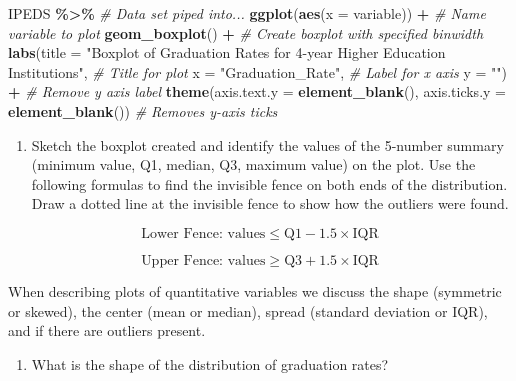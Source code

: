 \documentclass[
]{report}
\newenvironment{Shaded}{\begin{snugshade}}{\end{snugshade}}
\newcommand{\AttributeTok}[1]{\textcolor[rgb]{0.13,0.29,0.53}{#1}}
\newcommand{\CommentTok}[1]{\textcolor[rgb]{0.56,0.35,0.01}{\textit{#1}}}
\newcommand{\FunctionTok}[1]{\textcolor[rgb]{0.13,0.29,0.53}{\textbf{#1}}}
\newcommand{\NormalTok}[1]{#1}
\newcommand{\SpecialCharTok}[1]{\textcolor[rgb]{0.81,0.36,0.00}{\textbf{#1}}}
\newcommand{\StringTok}[1]{\textcolor[rgb]{0.31,0.60,0.02}{#1}}
\providecommand{\tightlist}{%
  \setlength{\itemsep}{0pt}\setlength{\parskip}{0pt}}
\begin{document}
\begin{Shaded}
\begin{Highlighting}[]
\NormalTok{IPEDS }\SpecialCharTok{\%\textgreater{}\%} \CommentTok{\# Data set piped into...}
\FunctionTok{ggplot}\NormalTok{(}\FunctionTok{aes}\NormalTok{(}\AttributeTok{x =}\NormalTok{ variable)) }\SpecialCharTok{+}   \CommentTok{\# Name variable to plot}
  \FunctionTok{geom\_boxplot}\NormalTok{() }\SpecialCharTok{+}  \CommentTok{\# Create boxplot with specified binwidth}
  \FunctionTok{labs}\NormalTok{(}\AttributeTok{title =} \StringTok{"Boxplot of Graduation Rates for 4{-}year Higher Education Institutions"}\NormalTok{, }\CommentTok{\# Title for plot}
       \AttributeTok{x =} \StringTok{"Graduation\_Rate"}\NormalTok{, }\CommentTok{\# Label for x axis}
       \AttributeTok{y =} \StringTok{""}\NormalTok{) }\SpecialCharTok{+} \CommentTok{\# Remove y axis label}
    \FunctionTok{theme}\NormalTok{(}\AttributeTok{axis.text.y =} \FunctionTok{element\_blank}\NormalTok{(), }
          \AttributeTok{axis.ticks.y =} \FunctionTok{element\_blank}\NormalTok{()) }\CommentTok{\# Removes y{-}axis ticks}
\end{Highlighting}
\end{Shaded}

\begin{enumerate}
\def\labelenumi{\arabic{enumi}.}
\setcounter{enumi}{6}
\tightlist
\item
  Sketch the boxplot created and identify the values of the 5-number summary (minimum value, Q1, median, Q3, maximum value) on the plot. Use the following formulas to find the invisible fence on both ends of the distribution. Draw a dotted line at the invisible fence to show how the outliers were found.
\end{enumerate}

\[\text{Lower Fence: values} \le \text{Q}1 - 1.5\times\text{IQR}\]

\[\text{Upper Fence: values} \ge \text{Q}3 + 1.5\times\text{IQR}\]
\vspace{1.8in}

When describing plots of quantitative variables we discuss the shape (symmetric or skewed), the center (mean or median), spread (standard deviation or IQR), and if there are outliers present.

\begin{enumerate}
\def\labelenumi{\arabic{enumi}.}
\setcounter{enumi}{7}
\tightlist
\item
  What is the shape of the distribution of graduation rates?
\end{enumerate}
\end{document}
